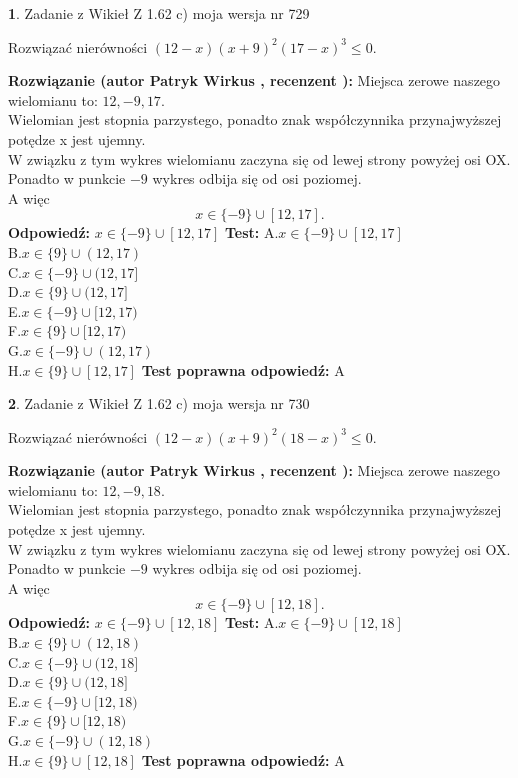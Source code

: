 \documentclass[12pt, a4paper]{article}
\theoremstyle{definition} %
\newtheorem{zad}{}
\newcommand{\zadStart}[1]{\begin{zad}#1\newline}
\newcommand{\zadStop}{\end{zad}}
\newcommand{\rozwStart}[2]{\noindent \textbf{Rozwiązanie (autor #1 , recenzent #2): }\newline}
\newcommand{\rozwStop}{\newline}
\newcommand{\odpStart}{\noindent \textbf{Odpowiedź:}\newline}
\newcommand{\odpStop}{\newline}
\newcommand{\testStart}{\noindent \textbf{Test:}\newline}
\newcommand{\testStop}{\newline}
\newcommand{\kluczStart}{\noindent \textbf{Test poprawna odpowiedź:}\newline}
\newcommand{\kluczStop}{\newline}
\begin{document}
\zadStart{Zadanie z Wikieł Z 1.62 c) moja wersja nr 729}

Rozwiązać nierówności $(12-x)(x+9)^{2}(17-x)^{3}\le0$.
\zadStop
\rozwStart{Patryk Wirkus}{}
Miejsca zerowe naszego wielomianu to: $12, -9, 17$.\\
Wielomian jest stopnia parzystego, ponadto znak współczynnika przy\linebreak najwyższej potędze x jest ujemny.\\ W związku z tym wykres wielomianu zaczyna się od lewej strony powyżej osi OX.\\
Ponadto w punkcie $-9$ wykres odbija się od osi poziomej.\\
A więc $$x \in \{-9\} \cup [12,17].$$
\rozwStop
\odpStart
$x \in \{-9\} \cup [12,17]$
\odpStop
\testStart
A.$x \in \{-9\} \cup [12,17]$\\
B.$x \in \{9\} \cup (12,17)$\\
C.$x \in \{-9\} \cup (12,17]$\\
D.$x \in \{9\} \cup (12,17]$\\
E.$x \in \{-9\} \cup [12,17)$\\
F.$x \in \{9\} \cup [12,17)$\\
G.$x \in \{-9\} \cup (12,17)$\\
H.$x \in \{9\} \cup [12,17]$
\testStop
\kluczStart
A
\kluczStop



\zadStart{Zadanie z Wikieł Z 1.62 c) moja wersja nr 730}

Rozwiązać nierówności $(12-x)(x+9)^{2}(18-x)^{3}\le0$.
\zadStop
\rozwStart{Patryk Wirkus}{}
Miejsca zerowe naszego wielomianu to: $12, -9, 18$.\\
Wielomian jest stopnia parzystego, ponadto znak współczynnika przy\linebreak najwyższej potędze x jest ujemny.\\ W związku z tym wykres wielomianu zaczyna się od lewej strony powyżej osi OX.\\
Ponadto w punkcie $-9$ wykres odbija się od osi poziomej.\\
A więc $$x \in \{-9\} \cup [12,18].$$
\rozwStop
\odpStart
$x \in \{-9\} \cup [12,18]$
\odpStop
\testStart
A.$x \in \{-9\} \cup [12,18]$\\
B.$x \in \{9\} \cup (12,18)$\\
C.$x \in \{-9\} \cup (12,18]$\\
D.$x \in \{9\} \cup (12,18]$\\
E.$x \in \{-9\} \cup [12,18)$\\
F.$x \in \{9\} \cup [12,18)$\\
G.$x \in \{-9\} \cup (12,18)$\\
H.$x \in \{9\} \cup [12,18]$
\testStop
\kluczStart
A
\kluczStop
\end{document}

